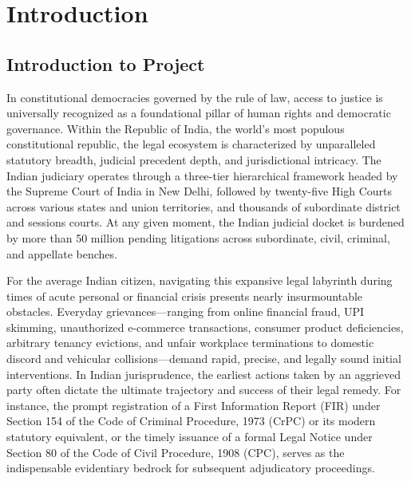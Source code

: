 \chapter{Introduction}
\label{chap:introduction}

\section{Introduction to Project}
\label{sec:intro_project}

In constitutional democracies governed by the rule of law, access to justice is universally recognized as a foundational pillar of human rights and democratic governance. Within the Republic of India, the world's most populous constitutional republic, the legal ecosystem is characterized by unparalleled statutory breadth, judicial precedent depth, and jurisdictional intricacy. The Indian judiciary operates through a three-tier hierarchical framework headed by the Supreme Court of India in New Delhi, followed by twenty-five High Courts across various states and union territories, and thousands of subordinate district and sessions courts. At any given moment, the Indian judicial docket is burdened by more than 50 million pending litigations across subordinate, civil, criminal, and appellate benches. 

For the average Indian citizen, navigating this expansive legal labyrinth during times of acute personal or financial crisis presents nearly insurmountable obstacles. Everyday grievances---ranging from online financial fraud, UPI skimming, unauthorized e-commerce transactions, consumer product deficiencies, arbitrary tenancy evictions, and unfair workplace terminations to domestic discord and vehicular collisions---demand rapid, precise, and legally sound initial interventions. In Indian jurisprudence, the earliest actions taken by an aggrieved party often dictate the ultimate trajectory and success of their legal remedy. For instance, the prompt registration of a First Information Report (FIR) under Section 154 of the Code of Criminal Procedure, 1973 (CrPC) or its modern statutory equivalent, or the timely issuance of a formal Legal Notice under Section 80 of the Code of Civil Procedure, 1908 (CPC), serves as the indispensable evidentiary bedrock for subsequent adjudicatory proceedings. 

